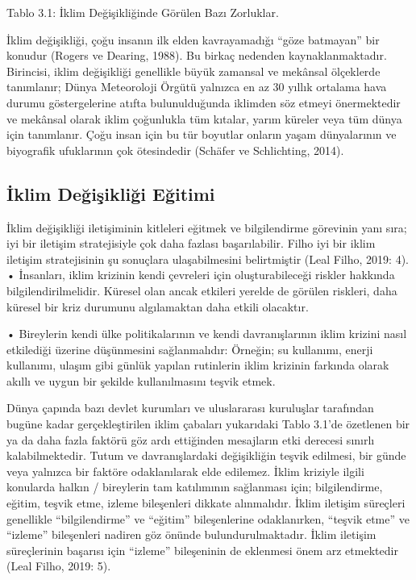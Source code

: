 \documentclass[
]{book}
\begin{document}
Tablo 3.1: İklim Değişikliğinde Görülen Bazı Zorluklar.

İklim değişikliği, çoğu insanın ilk elden kavrayamadığı ``göze batmayan'' bir konudur (Rogers ve Dearing, 1988). Bu birkaç nedenden kaynaklanmaktadır. Birincisi, iklim değişikliği genellikle büyük zamansal ve mekânsal ölçeklerde tanımlanır; Dünya Meteoroloji Örgütü yalnızca en az 30 yıllık ortalama hava durumu göstergelerine atıfta bulunulduğunda iklimden söz etmeyi önermektedir ve mekânsal olarak iklim çoğunlukla tüm kıtalar, yarım küreler veya tüm dünya için tanımlanır. Çoğu insan için bu tür boyutlar onların yaşam dünyalarının ve biyografik ufuklarının çok ötesindedir (Schäfer ve Schlichting, 2014).

\hypertarget{iklim-deux11fiux15fikliux11fi-eux11fitimi}{%
\subsection{İklim Değişikliği Eğitimi}\label{iklim-deux11fiux15fikliux11fi-eux11fitimi}}

İklim değişikliği iletişiminin kitleleri eğitmek ve bilgilendirme görevinin yanı sıra; iyi bir iletişim stratejisiyle çok daha fazlası başarılabilir. Filho iyi bir iklim iletişim stratejisinin şu sonuçlara ulaşabilmesini belirtmiştir (Leal Filho, 2019: 4).
• İnsanları, iklim krizinin kendi çevreleri için oluşturabileceği riskler hakkında bilgilendirilmelidir. Küresel olan ancak etkileri yerelde de görülen riskleri, daha küresel bir kriz durumunu algılamaktan daha etkili olacaktır.

• Bireylerin kendi ülke politikalarının ve kendi davranışlarının iklim krizini nasıl etkilediği üzerine düşünmesini sağlanmalıdır: Örneğin; su kullanımı, enerji kullanımı, ulaşım gibi günlük yapılan rutinlerin iklim krizinin farkında olarak akıllı ve uygun bir şekilde kullanılmasını teşvik etmek.

Dünya çapında bazı devlet kurumları ve uluslararası kuruluşlar tarafından bugüne kadar gerçekleştirilen iklim çabaları yukarıdaki Tablo 3.1'de özetlenen bir ya da daha fazla faktörü göz ardı ettiğinden mesajların etki derecesi sınırlı kalabilmektedir. Tutum ve davranışlardaki değişikliğin teşvik edilmesi, bir günde veya yalnızca bir faktöre odaklanılarak elde edilemez. İklim kriziyle ilgili konularda halkın / bireylerin tam katılımının sağlanması için; bilgilendirme, eğitim, teşvik etme, izleme bileşenleri dikkate alınmalıdır. İklim iletişim süreçleri genellikle ``bilgilendirme'' ve ``eğitim'' bileşenlerine odaklanırken, ``teşvik etme'' ve ``izleme'' bileşenleri nadiren göz önünde bulundurulmaktadır. İklim iletişim süreçlerinin başarısı için ``izleme'' bileşeninin de eklenmesi önem arz etmektedir (Leal Filho, 2019: 5).
\end{document}
